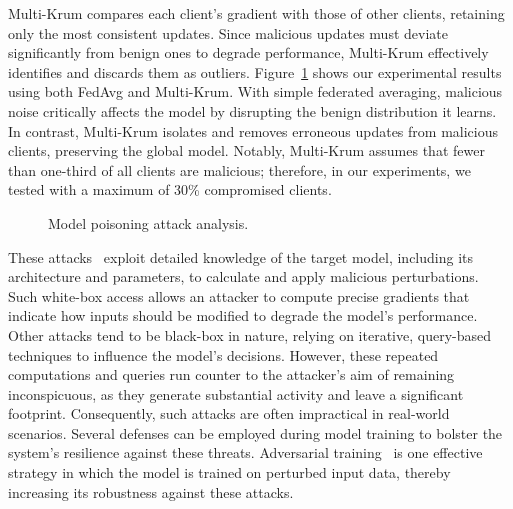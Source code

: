 Multi-Krum compares each client’s gradient with those of other clients, retaining only the most consistent updates. Since malicious updates must deviate significantly from benign ones to degrade performance, Multi-Krum effectively identifies and discards them as outliers. Figure~\ref{fig:poison} shows our experimental results using both FedAvg and Multi-Krum. With simple federated averaging, malicious noise critically affects the model by disrupting the benign distribution it learns. In contrast, Multi-Krum isolates and removes erroneous updates from malicious clients, preserving the global model. Notably, Multi-Krum assumes that fewer than one-third of all clients are malicious; therefore, in our experiments, we tested with a maximum of 30\% compromised clients.

\begin{figure}[!t]
    \centering
    \hfill
    \hfill
    \caption{Model poisoning attack analysis.}
    \label{fig:poison}
  \end{figure}

 These attacks~\cite{chakraborty2021survey} exploit detailed knowledge of the target model, including its architecture and parameters, to calculate and apply malicious perturbations. Such white-box access allows an attacker to compute precise gradients that indicate how inputs should be modified to degrade the model’s performance. Other attacks tend to be black-box in nature, relying on iterative, query-based techniques to influence the model’s decisions. However, these repeated computations and queries run counter to the attacker’s aim of remaining inconspicuous, as they generate substantial activity and leave a significant footprint. Consequently, such attacks are often impractical in real-world scenarios. Several defenses can be employed during model training to bolster the system’s resilience against these threats. Adversarial training~\cite{tramer2019adversarial} is one effective strategy in which the model is trained on perturbed input data, thereby increasing its robustness against these attacks.
